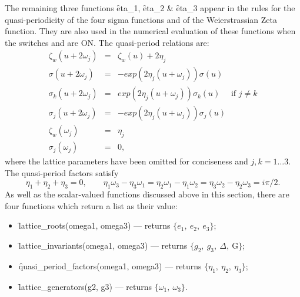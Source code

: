 \hypertarget{operator:ETA_1}{}
\hypertarget{operator:ETA_2}{}
\hypertarget{operator:ETA_3}{}
The remaining three functions \f{eta\_1}, \f{eta\_2} \& \f{eta\_3} appear in
the rules for the quasi-periodicity of the four sigma functions and of the
Weierstrassian Zeta function. They are also used in the numerical
evaluation of these functions when the switches  and 
are ON. The quasi-period relations are:
\begin{eqnarray*}
  \zeta_w(u+2\omega_j) & = & \zeta_w(u)+2\eta_j\\
  \sigma(u+2\omega_j) & = & -exp(2\eta_j(u+\omega_j))\sigma(u)\\
  \sigma_k(u+2\omega_j) & = &  exp(2\eta_j(u+\omega_j))\sigma_k(u) \quad\text{  if  }j\neq k\\
  \sigma_j(u+2\omega_j) & = & -exp(2\eta_j(u+\omega_j))\sigma_j(u)\\
  \zeta_w(\omega_j) & = & \eta_j\\
  \sigma_j(\omega_j) & = & 0,
\end{eqnarray*}
where the lattice parameters have been omitted for conciseness and $j,k = 1\ldots 3$.
The quasi-period factors satisfy
\[\eta_1+\eta_2+\eta_3=0,\qquad
   \eta_1\omega_3-\eta_3\omega_1=\eta_2\omega_1-\eta_1\omega_2=\eta_3\omega_2-\eta_2\omega_3=i\pi/2.\]
As well as the scalar-valued functions discussed above in this section,
there are four functions which return a list as their value:
\hypertarget{operator:LATTICE_ROOTS}{}
\hypertarget{operator:LATTICE_INVARIANTS}{}
\hypertarget{operator:LATTICE_GENERATORS}{}
\hypertarget{operator:QUASI_PERIOD_FACTORS}{}
\hypertarget{operator:LATTICE_ROOTS}{}
\hypertarget{operator:LATTICE_INVARIANTS}{}
\hypertarget{operator:LATTICE_GENERATORS}{}
\hypertarget{operator:QUASI_PERIOD_FACTORS}{}
\begin{itemize}
\item \f{lattice\_roots(omega1, omega3)} --- returns $\{e_1,\ e_2,\ e_3\}$;
\item \f{lattice\_invariants(omega1, omega3)} --- returns
  $\{g_2,\ g_3,\ \Delta,\ \mathrm{G}\}$;
\item \f{quasi\_period\_factors(omega1, omega3)}
  --- returns $\{\eta_1,\ \eta_2,\ \eta_3\}$;
\item \f{lattice\_generators(g2, g3)}  --- returns $\{\omega_1,\ \omega_3\}$.
\end{itemize}
